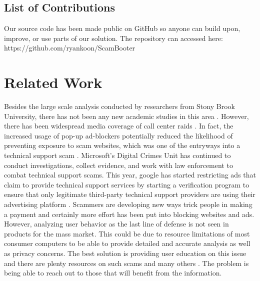 \documentclass[final]{IEEEtran}
\begin{document}


\subsection{List of Contributions}
Our source code has been made public on GitHub so anyone can build upon, improve, or use parts of our solution. The repository can accessed here: https://github.com/ryankoon/ScamBooter


\section{Related Work} %
Besides the large scale analysis conducted by researchers from Stony Brook University, there has not been any new academic studies in this area \cite{b2}. However, there has been widespread media coverage of call center raids \cite{b6}. In fact, the increased usage of pop-up ad-blockers potentially reduced the likelihood  of preventing exposure to scam websites, which was one of the entryways into a technical support scam \cite{b7}. Microsoft's Digital Crimes Unit has continued to conduct investigations, collect evidence, and work with law enforcement to combat technical support scams. This year, google has started restricting ads that claim to provide technical support services by starting a verification program to ensure that only legitimate third-party technical support providers are using their advertising platform \cite{b8}. Scammers are developing new ways trick people in making a payment and certainly more effort has been put into blocking websites and ads. However, analyzing user behavior as the last line of defense is not seen in products for the mass market. This could be due to resource limitations of most consumer computers to be able to provide detailed and accurate analysis as well as privacy concerns. The best solution is providing user education on this issue and there are plenty resources on such scams and many others \cite{b10}. The problem is being able to reach out to those that will benefit from the information.
\end{document}
